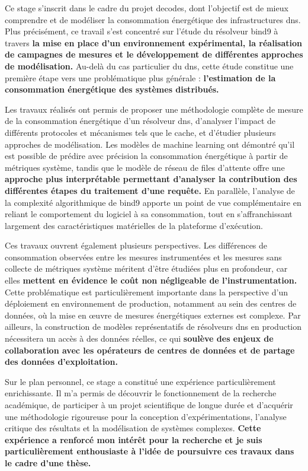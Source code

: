 \documentclass[12pt, a4paper]{report}
\begin{document}
	Ce stage s'inscrit dans le cadre du projet \gls{decodes}, dont l'objectif est de mieux comprendre et de modéliser la consommation énergétique des infrastructures \gls{dns}. Plus précisément, ce travail s'est concentré sur l'étude du résolveur \gls{bind9} à travers \textbf{la mise en place d'un environnement expérimental, la réalisation de campagnes de mesures et le développement de différentes approches de modélisation.} Au-delà du cas particulier du \gls{dns}, cette étude constitue une première étape vers une problématique plus générale : \textbf{l'estimation de la consommation énergétique des systèmes distribués.}

	Les travaux réalisés ont permis de proposer une méthodologie complète de mesure de la consommation énergétique d'un résolveur \gls{dns}, d'analyser l'impact de différents protocoles et mécanismes tels que le cache, et d'étudier plusieurs approches de modélisation. Les modèles de machine learning ont démontré qu'il est possible de prédire avec précision la consommation énergétique à partir de métriques système, tandis que le modèle de réseau de files d'attente offre une \textbf{approche plus interprétable permettant d'analyser la contribution des différentes étapes du traitement d'une requête.} En parallèle, l'analyse de la complexité algorithmique de \gls{bind9} apporte un point de vue complémentaire en reliant le comportement du logiciel à sa consommation, tout en s'affranchissant largement des caractéristiques matérielles de la plateforme d'exécution.

	Ces travaux ouvrent également plusieurs perspectives. Les différences de consommation observées entre les mesures instrumentées et les mesures sans collecte de métriques système méritent d'être étudiées plus en profondeur, car elles \textbf{mettent en évidence le coût non négligeable de l'instrumentation.} Cette problématique est particulièrement importante dans la perspective d'un déploiement en environnement de production, notamment au sein des centres de données, où la mise en œuvre de mesures énergétiques externes est complexe. Par ailleurs, la construction de modèles représentatifs de résolveurs \gls{dns} en production nécessitera un accès à des données réelles, ce qui \textbf{soulève des enjeux de collaboration avec les opérateurs de centres de données et de partage des données d'exploitation.}

	Sur le plan personnel, ce stage a constitué une expérience particulièrement enrichissante. Il m'a permis de découvrir le fonctionnement de la recherche académique, de participer à un projet scientifique de longue durée et d'acquérir une méthodologie rigoureuse pour la conception d'expérimentations, l'analyse critique des résultats et la modélisation de systèmes complexes. \textbf{Cette expérience a renforcé mon intérêt pour la recherche et je suis particulièrement enthousiaste à l'idée de poursuivre ces travaux dans le cadre d'une thèse.}
\end{document}
